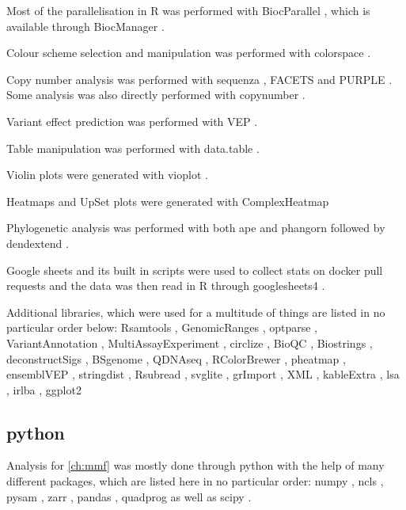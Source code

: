 {Most of the parallelisation in R was performed with BiocParallel \cite{Morgan2020}, which is available through BiocManager \cite{Morgan2019}.

Colour scheme selection and manipulation was performed with colorspace \cite{Zeileis2009,Zeileis2020}.

Copy number analysis was performed with sequenza \cite{Favero2015}, FACETS \cite{Shen2016,Seshan2018} and PURPLE \cite{Cameron2019a}. Some analysis was also directly performed with copynumber \cite{Nilsen2012,Nilsen2021}.

Variant effect prediction was performed with VEP \cite{McLaren2016}.

Table manipulation was performed with data.table \cite{Dowle2021}.

Violin plots were generated with vioplot \cite{Adler2020}.

Heatmaps and UpSet plots were generated with ComplexHeatmap \cite{Gu2016}

Phylogenetic analysis was performed with both ape \cite{Paradis2018} and phangorn \cite{Schliep2017} followed by dendextend \cite{Galili2015}.

Google sheets and its built in scripts were used to collect stats on docker pull requests and the data was then read in R through googlesheets4 \cite{Bryan2021}.

Additional libraries, which were used for a multitude of things are listed in no particular order below: Rsamtools \cite{Morgan2021}, GenomicRanges \cite{Lawrence2013}, optparse \cite{Davis2020}, VariantAnnotation \cite{Obenchain2014}, MultiAssayExperiment \cite{Ramos2017}, circlize \cite{Gu2014}, BioQC \cite{Zhang2017}, Biostrings \cite{Pages2020}, deconstructSigs \cite{Rosenthal2016}, BSgenome \cite{Pages2020a}, QDNAseq \cite{Scheinin2014}, RColorBrewer \cite{Neuwirth2014}, pheatmap \cite{Kolde2019}, ensemblVEP \cite{Obenchain2020}, stringdist \cite{vanderLoo2014}, Rsubread \cite{Liao2019}, svglite \cite{Wickham2021}, grImport \cite{Murrell2009}, XML \cite{TempleLang2020}, kableExtra \cite{Zhu2021}, lsa \cite{Wild2020}, irlba \cite{Baglama2019}, ggplot2 \cite{Wickham2016}


\subsection*{python}
Analysis for \autoref{ch:mmf} was mostly done through python \cite{VanRossum2010} with the help of many different packages, which are listed here in no particular order: numpy \cite{Harris2020}, ncls \cite{Stovner2019}, pysam \cite{Heger2021,Bonfield2021,Danecek2021}, zarr \cite{Miles2021}, pandas \cite{McKinney2010,Reback2021}, quadprog \cite{McGibbon2021} as well as scipy \cite{Virtanen2020}.

}
